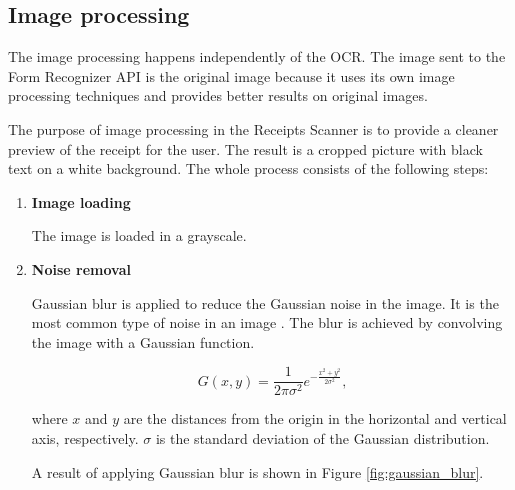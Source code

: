 \documentclass[
  digital, %
  table,   %
  oneside, %
  lof,     %
  lot,     %
]{fithesis3}
\begin{document}
\subsection{Image processing}
The image processing happens independently of the OCR. The image sent to the Form Recognizer API is the original image because it uses its own image processing techniques and provides better results on original images.

The purpose of image processing in the Receipts Scanner is to provide a cleaner preview of the receipt for the user. The result is a cropped picture with black text on a white background. The whole process consists of the following steps:

\begin{enumerate}
    \item \textbf{Image loading} 
    
    The image is loaded in a grayscale.
    
    \item \textbf{Noise removal} 

    Gaussian blur is applied to reduce the Gaussian noise in the image. It is the most common type of noise in an image \cite{Shreya2019OCRCNN}. The blur is achieved by convolving the image with a Gaussian function.
    
    \begin{equation}
    G(x,y) = \frac{1}{2\pi\sigma^2}e^{-\frac{x^2+y^2}{2\sigma^2}}\text{,}
    \end{equation}
    
    where $x$ and $y$ are the distances from the origin in the horizontal and vertical axis, respectively. $\sigma$ is the standard deviation of the Gaussian distribution. \cite{Shreya2019OCRCNN}
    
    A result of applying Gaussian blur is shown in Figure \ref{fig:gaussian_blur}.
    

\end{enumerate}
\end{document}
